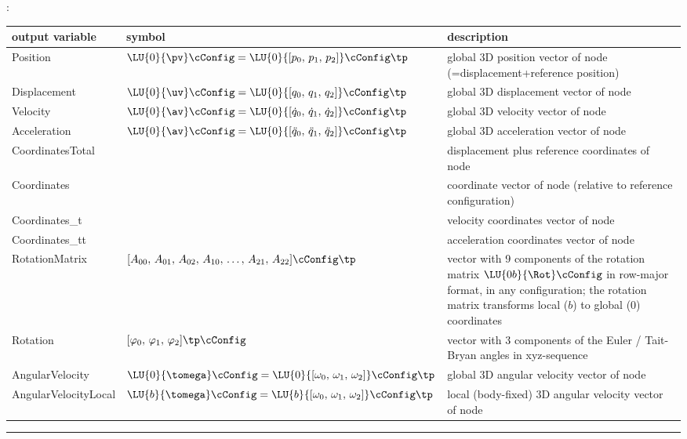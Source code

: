 :
\begin{center}
\footnotesize
\begin{longtable}{| p{5cm} | p{5cm} | p{6cm} |} 
\hline
\bf output variable & \bf symbol & \bf description \\ \hline
Position & $\LU{0}{\pv}\cConfig = \LU{0}{[p_0,\, p_1,\, p_2]}\cConfig\tp$ & global 3D position vector of node (=displacement+reference position)\\ \hline
Displacement & $\LU{0}{\uv}\cConfig = \LU{0}{[q_0,\, q_1,\, q_2]}\cConfig\tp$ & global 3D displacement vector of node\\ \hline
Velocity & $\LU{0}{\av}\cConfig = \LU{0}{[\dot q_0,\,\dot q_1,\,\dot q_2]}\cConfig\tp$ & global 3D velocity vector of node\\ \hline
Acceleration & $\LU{0}{\av}\cConfig = \LU{0}{[\ddot q_0,\,\ddot q_1,\,\ddot q_2]}\cConfig\tp$ & global 3D acceleration vector of node\\ \hline
CoordinatesTotal &  & displacement plus reference coordinates of node\\ \hline
Coordinates &  & coordinate vector of node (relative to reference configuration)\\ \hline
Coordinates\_t &  & velocity coordinates vector of node\\ \hline
Coordinates\_tt &  & acceleration coordinates vector of node\\ \hline
RotationMatrix & $[A_{00},\,A_{01},\,A_{02},\,A_{10},\,\ldots,\,A_{21},\,A_{22}]\cConfig\tp$ & vector with 9 components of the rotation matrix $\LU{0b}{\Rot}\cConfig$ in row-major format, in any configuration; the rotation matrix transforms local ($b$) to global (0) coordinates\\ \hline
Rotation & $[\varphi_0,\,\varphi_1,\,\varphi_2]\tp\cConfig$ & vector with 3 components of the Euler / Tait-Bryan angles in xyz-sequence\\ \hline
AngularVelocity & $\LU{0}{\tomega}\cConfig = \LU{0}{[\omega_0,\,\omega_1,\,\omega_2]}\cConfig\tp$ & global 3D angular velocity vector of node\\ \hline
AngularVelocityLocal & $\LU{b}{\tomega}\cConfig = \LU{b}{[\omega_0,\,\omega_1,\,\omega_2]}\cConfig\tp$ & local (body-fixed)  3D angular velocity vector of node\\ \hline
\end{longtable}
\end{center}
\vspace{6pt}\par\noindent\rule{\textwidth}{0.4pt}
